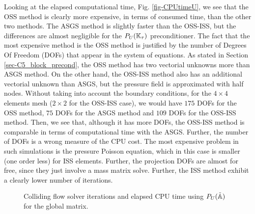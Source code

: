 Looking at the elapsed computational time, Fig. \ref{fig-CPUtimeU}, we see that the OSS method is clearly more expensive, in terms of consumed time, than the other two methods. The ASGS method is slightly faster than the OSS-ISS, but the differences are almost negligible for the $P_U(\mathbb{K}_\tau)$ preconditioner. The fact that the most expensive method is the OSS method is justified by the number of Degrees Of Freedom (DOFs) that appear in the system of equations. As stated in Section \ref{sec-C5_block_precond}, the OSS method has two vectorial unknowns more than ASGS method. On the other hand, the OSS-ISS method also has an additional vectorial unknown than ASGS, but the pressure field is approximated with half nodes. Without taking into account the boundary conditions, for the $4\times4$ elements mesh ($2\times2$ for the OSS-ISS case), we would have $175$ DOFs for the OSS method, $75$ DOFs for the ASGS method and $109$ DOFs for the OSS-ISS method. Then, we see that, although it has more DOFs, the OSS-ISS method is comparable in terms of computational time with the ASGS. Further, the number of DOFs is a wrong measure of the CPU cost. The most expensive problem in such simulations is the pressure Poisson equation, which in this case is smaller (one order less) for ISS elements. Further, the projection DOFs are almost for free, since they just involve a mass matrix solve. Further, the ISS method exhibit a clearly lower number of iterations.
\begin{figure}[h!]
  \centering
  \caption{Colliding flow solver iterations and elapsed CPU time using $P_U(\tilde{\mathbb{A}})$ for the global matrix.}
  \label{fig-soliter-CPUtime}
\end{figure}

